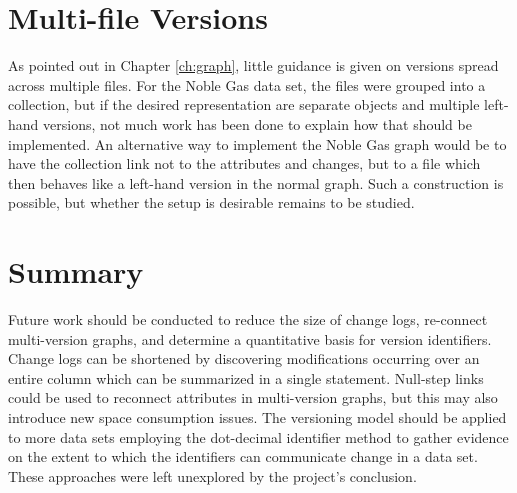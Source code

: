 \section{Multi-file Versions}

As pointed out in Chapter \ref{ch:graph}, little guidance is given on versions spread across multiple files.
For the Noble Gas data set, the files were grouped into a collection, but if the desired representation are separate objects and multiple left-hand versions, not much work has been done to explain how that should be implemented.
An alternative way to implement the Noble Gas graph would be to have the collection link not to the attributes and changes, but to a file which then behaves like a left-hand version in the normal graph.
Such a construction is possible, but whether the setup is desirable remains to be studied.

\section{Summary}

Future work should be conducted to reduce the size of change logs, re-connect multi-version graphs, and determine a quantitative basis for version identifiers.
Change logs can be shortened by discovering modifications occurring over an entire column which can be summarized in a single statement.
Null-step links could be used to reconnect attributes in multi-version graphs, but this may also introduce new space consumption issues.
The versioning model should be applied to more data sets employing the dot-decimal identifier method to gather evidence on the extent to which the identifiers can communicate change in a data set.
These approaches were left unexplored by the project's conclusion.
